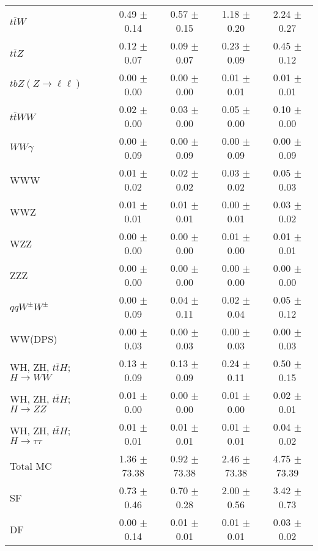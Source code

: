 \begin{tabular}{l|cccc}
                   $t\overline{t}W$ &  0.49 $\pm$  0.14 &  0.57 $\pm$  0.15 &  1.18 $\pm$  0.20 &  2.24 $\pm$  0.27 \\
                   $t\overline{t}Z$ &  0.12 $\pm$  0.07 &  0.09 $\pm$  0.07 &  0.23 $\pm$  0.09 &  0.45 $\pm$  0.12 \\
    $tbZ (Z \rightarrow \ell \ell)$ &  0.00 $\pm$  0.00 &  0.00 $\pm$  0.00 &  0.01 $\pm$  0.01 &  0.01 $\pm$  0.01 \\
                  $t\overline{t}WW$ &  0.02 $\pm$  0.00 &  0.03 $\pm$  0.00 &  0.05 $\pm$  0.00 &  0.10 $\pm$  0.00 \\
                         $WW\gamma$ &  0.00 $\pm$  0.09 &  0.00 $\pm$  0.09 &  0.00 $\pm$  0.09 &  0.00 $\pm$  0.09 \\
                                WWW &  0.01 $\pm$  0.02 &  0.02 $\pm$  0.02 &  0.03 $\pm$  0.02 &  0.05 $\pm$  0.03 \\
                                WWZ &  0.01 $\pm$  0.01 &  0.01 $\pm$  0.01 &  0.00 $\pm$  0.01 &  0.03 $\pm$  0.02 \\
                                WZZ &  0.00 $\pm$  0.00 &  0.00 $\pm$  0.00 &  0.01 $\pm$  0.00 &  0.01 $\pm$  0.01 \\
                                ZZZ &  0.00 $\pm$  0.00 &  0.00 $\pm$  0.00 &  0.00 $\pm$  0.00 &  0.00 $\pm$  0.00 \\
                 $qqW^{\pm}W^{\pm}$ &  0.00 $\pm$  0.09 &  0.04 $\pm$  0.11 &  0.02 $\pm$  0.04 &  0.05 $\pm$  0.12 \\
                            WW(DPS) &  0.00 $\pm$  0.03 &  0.00 $\pm$  0.03 &  0.00 $\pm$  0.03 &  0.00 $\pm$  0.03 \\
WH, ZH, $t\bar{t}H$; $H \rightarrow WW$ &  0.13 $\pm$  0.09 &  0.13 $\pm$  0.09 &  0.24 $\pm$  0.11 &  0.50 $\pm$  0.15 \\
WH, ZH, $t\bar{t}H$; $H \rightarrow ZZ$ &  0.01 $\pm$  0.00 &  0.00 $\pm$  0.00 &  0.01 $\pm$  0.00 &  0.02 $\pm$  0.01 \\
WH, ZH, $t\bar{t}H$; $H \rightarrow \tau\tau$ &  0.01 $\pm$  0.01 &  0.01 $\pm$  0.01 &  0.01 $\pm$  0.01 &  0.04 $\pm$  0.02 \\
\hline\hline
                           Total MC &  1.36 $\pm$ 73.38 &  0.92 $\pm$ 73.38 &  2.46 $\pm$ 73.38 &  4.75 $\pm$ 73.39 \\
\hline
                                 SF &  0.73 $\pm$  0.46 &  0.70 $\pm$  0.28 &  2.00 $\pm$  0.56 &  3.42 $\pm$  0.73 \\
                                 DF &  0.00 $\pm$  0.14 &  0.01 $\pm$  0.01 &  0.01 $\pm$  0.01 &  0.03 $\pm$  0.02 \\

\end{tabular}
